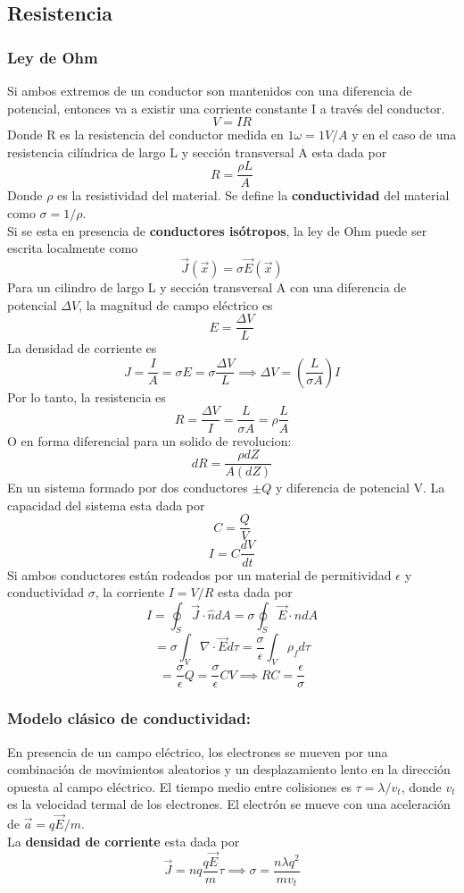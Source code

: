 \documentclass[a4paper, 10pt]{article}
\begin{document}
\begin{multicols*}{2}
	\subsection{Resistencia}
	\subsubsection{Ley de Ohm}
	Si ambos extremos de un conductor son mantenidos con una diferencia de potencial, entonces va a existir una corriente constante I a través del conductor.
	$$V = IR$$
	Donde R es la resistencia del conductor medida en $1 \omega = 1 V/A$ y en el caso de una resistencia cilíndrica de largo L y sección transversal A esta dada por 
	$$R=\frac{\rho L}{A}$$
	Donde $\rho$ es la resistividad del material.
	Se define la \textbf{conductividad }del material como $\sigma=1/\rho$.\\
	Si se esta en presencia de \textbf{conductores isótropos}, la ley de Ohm puede ser escrita localmente como 
  $$\vec{J}(\vec{x})=\sigma\vec{E}(\vec{x})$$
	Para un cilindro de largo L y sección transversal A con una diferencia de potencial $\Delta V$, la magnitud de campo eléctrico es
	$$E=\frac{\Delta V}{L}$$
	La densidad de corriente es
	$$J= \frac{I}{A}=\sigma E=\sigma \frac{\Delta V}{L }\implies \Delta V = (\frac{L}{\sigma A})I$$
	Por lo tanto, la resistencia es
	$$R=\frac{\Delta V}{I}=\frac{L}{\sigma A}=\rho \frac{L}{A}$$
  O en forma diferencial para un solido de revolucion:
  \begin{equation}
    dR = \frac{\rho dZ}{A(dZ)} 
  \end{equation}
	En un sistema formado por dos conductores $\pm Q$ y diferencia de potencial V. La capacidad del sistema esta dada por 
	$$C=\frac{Q}{V}$$
  \begin{equation}
    I = C \frac{dV}{dt}
  \end{equation}
	Si ambos conductores están rodeados por un material de permitividad $\epsilon$ y conductividad $\sigma$, la corriente $I=V/R$ esta dada por
	$$I = \oint_S \vec{J} \cdot \hat{n} dA = \sigma \oint_S \vec{E} \cdot \hat{n} dA$$
	$$= \sigma \int_V \nabla \cdot \vec{E} d \tau = \frac{\sigma}{\epsilon} \int_V \rho_f d\tau$$
	$$= \frac{\sigma}{\epsilon}Q=\frac{\sigma}{\epsilon} CV \implies RC=\frac{\epsilon}{\sigma}$$

	\subsubsection{Modelo clásico de conductividad: }En presencia de un campo eléctrico, los electrones se mueven por una combinación de movimientos aleatorios y un desplazamiento lento en la dirección opuesta al campo eléctrico.
	El tiempo medio entre colisiones es $\tau =\lambda / v_t$, donde $v_t $ es la velocidad termal de los electrones. El electrón se mueve con una aceleración de $\vec{a}=q\vec{E}/m$.\\
	La \textbf{densidad de corriente} esta dada por
	$$\vec{J} = nq \frac{q \vec{E}}{m}\tau \implies \sigma = \frac{n \lambda q^2}{m v_t}$$
	    

\end{multicols*}
\end{document}
